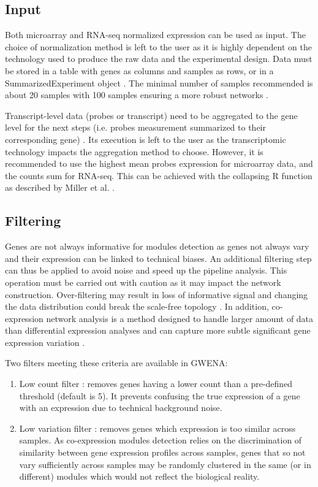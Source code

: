 \subsection{Input}

Both microarray and  RNA-seq normalized expression can be used as input. The choice of normalization method is left to the user as it is highly dependent on the technology used to produce the raw data and the experimental design. Data must be stored in a table with genes as columns and samples as rows, or in a SummarizedExperiment object . The minimal number of samples recommended is about 20 samples  with 100 samples ensuring a more robust networks .

Transcript-level data (probes or transcript) need to be aggregated to the gene level for the next steps (i.e. probes measurement summarized to their corresponding gene) . Its execution is left to the user as the transcriptomic technology impacts the aggregation method to choose. However, it is recommended to use the highest mean probes expression for microarray data, and the counts sum for RNA-seq. This can be achieved with the collapsing R function as described by Miller et al. .


\subsection{Filtering}

Genes are not always informative for modules detection as genes not always vary and their expression can be linked to technical biases. An additional filtering step can thus be applied to avoid noise and speed up the pipeline analysis. This operation must be carried out with caution as it may impact the network construction. Over-filtering may result in loss of informative signal and changing the data distribution could break the scale-free topology . In addition, co-expression network analysis is a method designed to handle larger amount of data than differential expression analyses and can capture more subtle significant gene expression variation .

Two filters meeting these criteria are available in GWENA:
\begin{enumerate}
    \item Low count filter : removes genes having a lower count than a pre-defined threshold (default is 5). It prevents confusing the true expression of a gene with an expression due to technical background noise. 
    \item Low variation filter : removes genes which expression is too similar across samples. As co-expression modules detection relies on the discrimination of similarity between gene expression profiles across samples, genes that so not vary sufficiently across samples may be randomly clustered in the same (or in different) modules which would not reflect the biological reality.
\end{enumerate}


